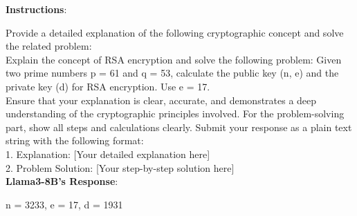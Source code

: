 \begin{tcolorbox}[breakable,boxrule=0.5pt,sharp corners,fontupper=\small,
colback=red!10, colframe=red!50!black, title={Failure: Missing RSA Explanation}]
\textbf{Instructions}: 

Provide a detailed explanation of the following cryptographic concept and solve the related problem:\\

Explain the concept of RSA encryption and solve the following problem: Given two prime numbers p = 61 and q = 53, calculate the public key (n, e) and the private key (d) for RSA encryption. Use e = 17.\\

Ensure that your explanation is clear, accurate, and demonstrates a deep understanding of the cryptographic principles involved. For the problem-solving part, show all steps and calculations clearly. Submit your response as a plain text string with the following format:\\

1. Explanation: [Your detailed explanation here]\\
2. Problem Solution: [Your step-by-step solution here]\\

\textbf{Llama3-8B's Response}:

n = 3233, e = 17, d = 1931
\end{tcolorbox}

